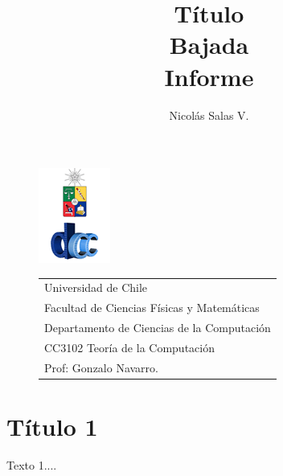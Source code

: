 \documentclass[12pt,letterpaper]{report}
\title{\Huge Título \\ Bajada \\ Informe}
\author{Nicolás Salas V.}
\begin{document}
\pagestyle{empty}
\begin{figure}[t]
\includegraphics[scale=0.83]{logo.png}
\begin{tabular}{l}
\small Universidad de Chile\\
\small Facultad de Ciencias Físicas y Matemáticas\\
\small Departamento de Ciencias de la Computación\\
\small CC3102 Teoría de la Computación\\
\small Prof: Gonzalo Navarro.
\vspace{2.3cm}
\end{tabular}
\end{figure}

\maketitle

\tableofcontents

\section{Título 1}

Texto 1....
\end{document}
